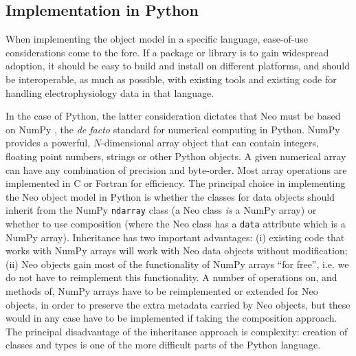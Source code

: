 \documentclass{frontiers}
\newcommand{\latin}[1]{\textit{#1}}
\begin{document}
\subsection{Implementation in Python}


When implementing the object model in a specific language, ease-of-use considerations come to the fore.
If a package or library is to gain widespread adoption, it should be easy to build and install on different platforms, and should be interoperable, as much as possible, with existing tools and existing code for handling electrophysiology data in that language.

In the case of Python, the latter consideration dictates that Neo must be based on NumPy \citep{Oliphant2007}, the \latin{de facto} standard for numerical computing in Python.
NumPy provides a powerful, $N$-dimensional array object that can contain integers, floating point numbers, strings or other Python objects.
A given numerical array can have any combination of precision and byte-order.
Most array operations are implemented in C or Fortran for efficiency.
The principal choice in implementing the Neo object model in Python is whether the classes for data objects should inherit from the NumPy \lstinline`ndarray` class (a Neo class \emph{is} a NumPy array) or whether to use composition (where the Neo class has a \lstinline`data` attribute which is a NumPy array).
Inheritance has two important advantages:
(i) existing code that works with NumPy arrays will work with Neo data objects without modification;
(ii) Neo objects gain most of the functionality of NumPy arrays ``for free'', i.e. we do not have to reimplement this functionality. 
A number of operations on, and methods of, NumPy arrays have to be reimplemented or extended for Neo objects, in order to preserve the extra metadata carried by Neo objects, but these would in any case have to be implemented if taking the composition approach.
The principal disadvantage of the inheritance approach is complexity: creation of classes and types is one of the more difficult parts of the Python language.
\end{document}
